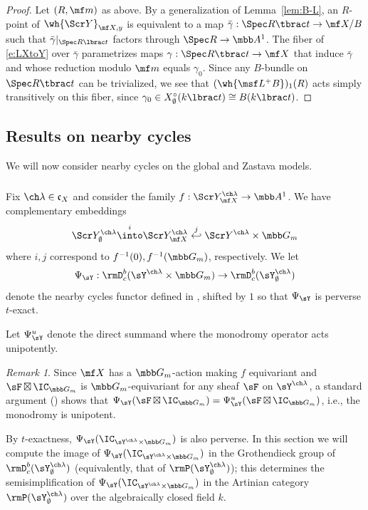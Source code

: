 \documentclass[final]{amsart}
\theoremstyle{remark}
\newtheorem{rem}[subsubsection]{Remark}
\theoremstyle{definition}
\DeclareMathOperator*{\bt}{\boxtimes}
\numberwithin{equation}{section}
\begin{document}
\begin{proof}
Let $(R,\mf m)$ as above.  
By a generalization of Lemma~\ref{lem:B-L}, an $R$-point of $\wh{\Scr Y}_{\mf X,y}$ is
equivalent to a map $\bar\gamma : \Spec R \tbrac t \to \mf X/B$ such that 
$\bar\gamma|_{\Spec R\lbrac t}$ factors through $\Spec R \to \mbb A^1$. 
The fiber of \eqref{e:LXtoY} over $\bar\gamma$ parametrizes 
maps $\gamma : \Spec R \tbrac t \to \mf X$ that induce $\bar\gamma$ 
and whose reduction modulo $\mf m$ equals $\gamma_0$.
Since any $B$-bundle on $\Spec R\tbrac t$ can be trivialized, 
we see that $(\wh{\msf L^+B})_1(R)$ acts simply transitively on this fiber, since 
$\gamma_0 \in X^\circ_\emptyset(k\lbrac t)\cong B(k\lbrac t)$.
\end{proof}

\subsection{Results on nearby cycles} \label{sect:results-nearby}
We will now consider nearby cycles on the global and Zastava models. 

\subsubsection{}
Fix $\ch\lambda \in \mathfrak c_X$ and consider the family 
$f:\Scr Y^{\ch\lambda}_{\mf X} \to \mbb A^1$. 
We have complementary embeddings 
\[ \Scr Y^{\ch\lambda}_\emptyset \overset i\into \Scr Y^{\ch\lambda}_{\mf X} \overset j\hookleftarrow \Scr Y^{\ch\lambda} \times \mbb G_m \]
where $i,j$ correspond to $f^{-1}(0), f^{-1}(\mbb G_m)$, respectively.
We let 
\[ \Psi_\sY : \rmD^b_c(\sY^{\ch\lambda} \times \mbb G_m) \to \rmD^b_c(\sY_\emptyset^{\ch\lambda})
\] 
denote the nearby cycles functor 
defined in \cite[Expos\'e XIII]{SGA7-2}, shifted by $1$ so that
$\Psi_\sY$ is perverse $t$-exact.  

Let $\Psi_\sY^u$ denote the direct summand where the monodromy operator acts unipotently. 
\begin{rem}
Since $\mf X$ has a $\mbb G_m$-action making $f$ equivariant
and $\sF \bt \IC_{\mbb G_m}$ is $\mbb G_m$-equivariant for any sheaf $\sF$ on $\sY^{\ch\lambda}$,
a standard argument (\cite[Remark 14]{AB}) shows that $\Psi_\sY(\sF \bt \IC_{\mbb G_m}) = \Psi_\sY^u(\sF \bt \IC_{\mbb G_m})$, i.e., the monodromy is unipotent. 
\end{rem}

By $t$-exactness, $\Psi_\sY(\IC_{\sY^{\ch\lambda}\times \mbb G_m})$ is also perverse. 
In this section we will compute the image 
of $\Psi_\sY(\IC_{\sY^{\ch\lambda} \times \mbb G_m})$ in the Grothendieck group
of $\rmD^b_c(\sY^{\ch\lambda}_\emptyset)$ (equivalently, that of $\rmP(\sY^{\ch\lambda}_\emptyset)$); 
this determines the semisimplification of $\Psi_\sY(\IC_{\sY^{\ch\lambda} \times \mbb G_m})$
in the Artinian category $\rmP(\sY^{\ch\lambda}_\emptyset)$
over the algebraically closed field $k$. 
\end{document}
